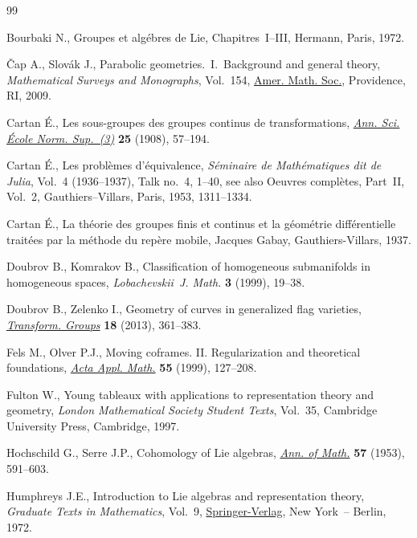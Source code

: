 \begin{thebibliography}{99}
\footnotesize\itemsep=0pt

Bourbaki N., Groupes et alg\'ebres de Lie, Chapitres~I--III, Hermann, Paris,
 1972.

\v{C}ap A., Slov\'ak J., Parabolic geometries.~{I}.~Background and general
 theory, \textit{Mathematical Surveys and Monographs}, Vol.~154, \href{https://doi.org/10.1090/surv/154}{Amer. Math.
 Soc.}, Providence, RI, 2009.

Cartan \'E., Les sous-groupes des groupes continus de transformations,
 \href{https://doi.org/10.24033/asens.588}{\textit{Ann. Sci. \'Ecole Norm. Sup.~(3)}} \textbf{25} (1908), 57--194.

Cartan \'E., Les probl\`emes d'\'equivalence, \textit{S\'eminaire de
 Math\'ematiques dit de Julia}, Vol.~4 (1936--1937), Talk no.~4, 1--40, see
 also Oeuvres compl\`etes, Part~II, Vol.~2, Gauthiers--Villars, Paris, 1953,
 1311--1334.

Cartan \'E., La th\'eorie des groupes finis et continus et la g\'eom\'etrie
 diff\'erentielle trait\'ees par la m\'ethode du rep\`ere mobile, {J}acques
 Gabay, Gauthiers-Villars, 1937.

Doubrov B., Komrakov B., Classification of homogeneous submanifolds in
 homogeneous spaces, \textit{Lobachevskii~J. Math.} \textbf{3} (1999), 19--38.

Doubrov B., Zelenko I., Geometry of curves in generalized flag varieties,
 \href{https://doi.org/10.1007/s00031-013-9217-x}{\textit{Transform. Groups}} \textbf{18} (2013), 361--383.

Fels M., Olver P.J., Moving coframes. {II}. {R}egularization and theoretical
 foundations, \href{https://doi.org/10.1023/A:1006195823000}{\textit{Acta Appl. Math.}} \textbf{55} (1999), 127--208.

Fulton W., Young tableaux with applications to representation theory and
 geometry, \textit{London Mathematical Society Student Texts}, Vol.~35,
 Cambridge University Press, Cambridge, 1997.

Hochschild G., Serre J.P., Cohomology of {L}ie algebras, \href{https://doi.org/10.2307/1969740}{\textit{Ann. of Math.}}
 \textbf{57} (1953), 591--603.

Humphreys J.E., Introduction to {L}ie algebras and representation theory,
 \textit{Graduate Texts in Mathematics}, Vol.~9, \href{https://doi.org/10.1007/978-1-4612-6398-2}{Springer-Verlag}, New York~--
 Berlin, 1972.


\end{thebibliography}
